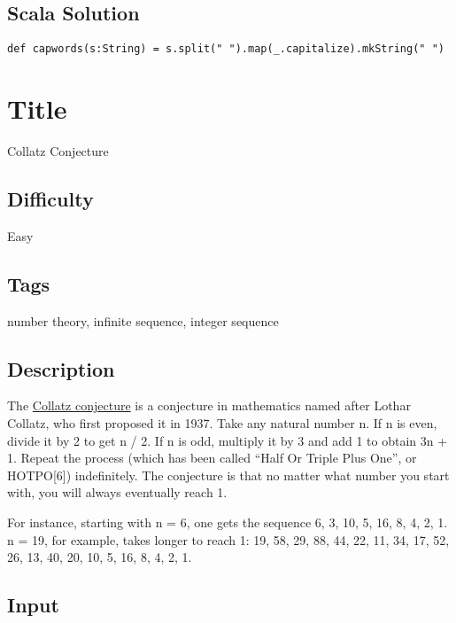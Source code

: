 \subsection{Scala Solution}\label{scala-solution-12}

\begin{verbatim}
def capwords(s:String) = s.split(" ").map(_.capitalize).mkString(" ")
\end{verbatim}

\section{Title}\label{title-19}

Collatz Conjecture

\subsection{Difficulty}\label{difficulty-18}

Easy

\subsection{Tags}\label{tags-19}

number theory, infinite sequence, integer sequence

\subsection{Description}\label{description-19}

The \href{https://en.wikipedia.org/wiki/Collatz_conjecture}{Collatz
conjecture} is a conjecture in mathematics named after Lothar Collatz,
who first proposed it in 1937. Take any natural number n. If n is even,
divide it by 2 to get n / 2. If n is odd, multiply it by 3 and add 1 to
obtain 3n + 1. Repeat the process (which has been called ``Half Or
Triple Plus One'', or HOTPO{[}6{]}) indefinitely. The conjecture is that
no matter what number you start with, you will always eventually reach
1.

For instance, starting with n = 6, one gets the sequence 6, 3, 10, 5,
16, 8, 4, 2, 1. n = 19, for example, takes longer to reach 1: 19, 58,
29, 88, 44, 22, 11, 34, 17, 52, 26, 13, 40, 20, 10, 5, 16, 8, 4, 2, 1.

\subsection{Input}\label{input-1}

